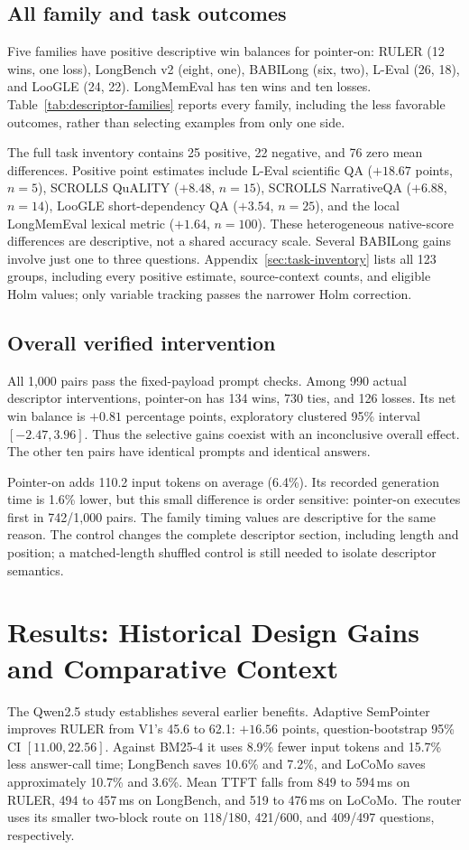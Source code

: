 \documentclass[runningheads]{llncs}
\begin{document}
\subsection{All family and task outcomes}

Five families have positive descriptive win balances for pointer-on: RULER (12 wins, one loss), LongBench v2 (eight, one), BABILong (six, two), L-Eval (26, 18), and LooGLE (24, 22). LongMemEval has ten wins and ten losses. Table~\ref{tab:descriptor-families} reports every family, including the less favorable outcomes, rather than selecting examples from only one side.

The full task inventory contains 25 positive, 22 negative, and 76 zero mean differences. Positive point estimates include L-Eval scientific QA ($+18.67$ points, $n=5$), SCROLLS QuALITY ($+8.48$, $n=15$), SCROLLS NarrativeQA ($+6.88$, $n=14$), LooGLE short-dependency QA ($+3.54$, $n=25$), and the local LongMemEval lexical metric ($+1.64$, $n=100$). These heterogeneous native-score differences are descriptive, not a shared accuracy scale. Several BABILong gains involve just one to three questions. Appendix~\ref{sec:task-inventory} lists all 123 groups, including every positive estimate, source-context counts, and eligible Holm values; only variable tracking passes the narrower Holm correction.

\subsection{Overall verified intervention}

All 1,000 pairs pass the fixed-payload prompt checks. Among 990 actual descriptor interventions, pointer-on has 134 wins, 730 ties, and 126 losses. Its net win balance is $+0.81$ percentage points, exploratory clustered 95\% interval $[-2.47,3.96]$. Thus the selective gains coexist with an inconclusive overall effect. The other ten pairs have identical prompts and identical answers.

Pointer-on adds 110.2 input tokens on average (6.4\%). Its recorded generation time is 1.6\% lower, but this small difference is order sensitive: pointer-on executes first in 742/1,000 pairs. The family timing values are descriptive for the same reason. The control changes the complete descriptor section, including length and position; a matched-length shuffled control is still needed to isolate descriptor semantics.

\section{Results: Historical Design Gains and Comparative Context}

The Qwen2.5 study establishes several earlier benefits. Adaptive SemPointer improves RULER from V1's 45.6 to 62.1: $+16.56$ points, question-bootstrap 95\% CI $[11.00,22.56]$. Against BM25-4 it uses 8.9\% fewer input tokens and 15.7\% less answer-call time; LongBench saves 10.6\% and 7.2\%, and LoCoMo saves approximately 10.7\% and 3.6\%. Mean TTFT falls from 849 to 594\,ms on RULER, 494 to 457\,ms on LongBench, and 519 to 476\,ms on LoCoMo. The router uses its smaller two-block route on 118/180, 421/600, and 409/497 questions, respectively.
\end{document}
